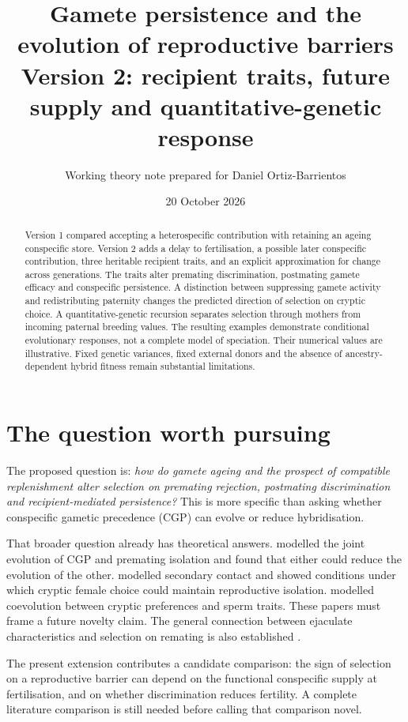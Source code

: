 \documentclass[11pt,a4paper]{article}
\title{Gamete persistence and the evolution of reproductive barriers\\\large Version 2: recipient traits, future supply and quantitative-genetic response}
\author{Working theory note prepared for Daniel Ortiz-Barrientos}
\date{20 October 2026}
\begin{document}
\maketitle
\begin{abstract}
Version 1 compared accepting a heterospecific contribution with retaining an ageing conspecific store. Version 2 adds a delay to fertilisation, a possible later conspecific contribution, three heritable recipient traits, and an explicit approximation for change across generations. The traits alter premating discrimination, postmating gamete efficacy and conspecific persistence. A distinction between suppressing gamete activity and redistributing paternity changes the predicted direction of selection on cryptic choice. A quantitative-genetic recursion separates selection through mothers from incoming paternal breeding values. The resulting examples demonstrate conditional evolutionary responses, not a complete model of speciation. Their numerical values are illustrative. Fixed genetic variances, fixed external donors and the absence of ancestry-dependent hybrid fitness remain substantial limitations.
\end{abstract}

\section{The question worth pursuing}
The proposed question is: \emph{how do gamete ageing and the prospect of compatible replenishment alter selection on premating rejection, postmating discrimination and recipient-mediated persistence?} This is more specific than asking whether conspecific gametic precedence (CGP) can evolve or reduce hybridisation.

That broader question already has theoretical answers. \citet{LorchServedio2007} modelled the joint evolution of CGP and premating isolation and found that either could reduce the evolution of the other. \citet{Kustra2025} modelled secondary contact and showed conditions under which cryptic female choice could maintain reproductive isolation. \citet{KustraAlonzo2023} modelled coevolution between cryptic preferences and sperm traits. These papers must frame a future novelty claim. The general connection between ejaculate characteristics and selection on remating is also established \citep{AlonzoPizzari2013}.

The present extension contributes a candidate comparison: the sign of selection on a reproductive barrier can depend on the functional conspecific supply at fertilisation, and on whether discrimination reduces fertility. A complete literature comparison is still needed before calling that comparison novel.
\end{document}
